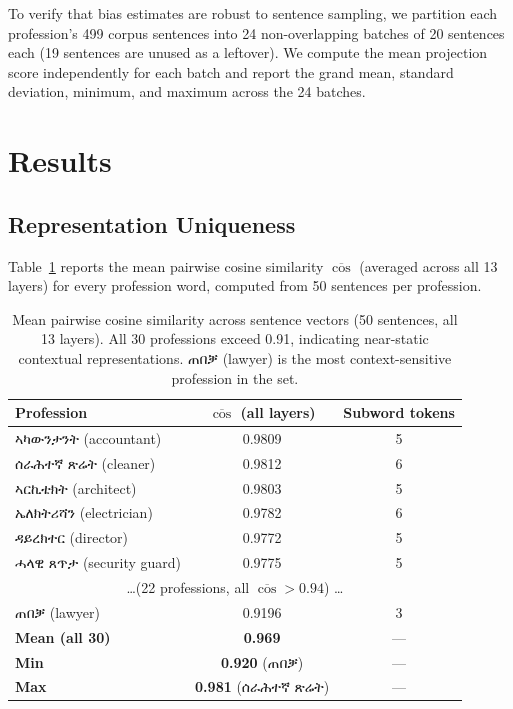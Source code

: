 \documentclass[11pt,a4paper]{article}
\begin{document}
To verify that bias estimates are robust to sentence sampling, we partition
each profession's 499 corpus sentences into 24 non-overlapping batches of 20
sentences each (19 sentences are unused as a leftover). We compute the mean
projection score independently for each batch and report the grand mean,
standard deviation, minimum, and maximum across the 24 batches.


\section{Results}

\subsection{Representation Uniqueness}

Table~\ref{tab:mean_cos} reports the mean pairwise cosine similarity
$\overline{\cos}$ (averaged across all 13 layers) for every profession word,
computed from 50 sentences per profession.

\begin{table}[h]
\centering
\small
\begin{tabular}{lcc}
\toprule
\textbf{Profession} & \textbf{$\overline{\cos}$ (all layers)} & \textbf{Subword tokens} \\
\midrule
{\ethiopicfont ኣካውንታንት}  (accountant)    & 0.9809 & 5 \\
{\ethiopicfont ሰራሕተኛ ጽሬት} (cleaner)      & 0.9812 & 6 \\
{\ethiopicfont ኣርኪቴክት}   (architect)     & 0.9803 & 5 \\
{\ethiopicfont ኤለክትሪሻን}  (electrician)   & 0.9782 & 6 \\
{\ethiopicfont ዳይረክተር}   (director)      & 0.9772 & 5 \\
{\ethiopicfont ሓላዊ ጸጥታ}  (security guard) & 0.9775 & 5 \\
\multicolumn{3}{c}{\ldots (22 professions, all $\overline{\cos} > 0.94$) \ldots} \\
{\ethiopicfont ጠበቓ}      (lawyer)        & 0.9196 & 3 \\
\midrule
\textbf{Mean (all 30)}   & \textbf{0.969} & --- \\
\textbf{Min}             & \textbf{0.920} ({\ethiopicfont ጠበቓ}) & --- \\
\textbf{Max}             & \textbf{0.981} ({\ethiopicfont ሰራሕተኛ ጽሬት}) & --- \\
\bottomrule
\end{tabular}
\caption{Mean pairwise cosine similarity across sentence vectors (50 sentences,
all 13 layers). All 30 professions exceed 0.91, indicating near-static
contextual representations. {\ethiopicfont ጠበቓ} (lawyer) is the most
context-sensitive profession in the set.}
\label{tab:mean_cos}
\end{table}
\end{document}
